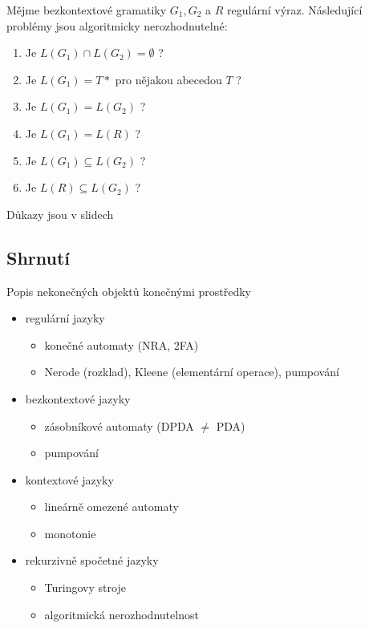 \documentclass[../main.tex]{subfiles}
\begin{document}
\begin{theorem}
    Mějme bezkontextové gramatiky $G_1,G_2$ a $R$ regulární výraz. Následující problémy jsou algoritmicky nerozhodnutelné:
    \begin{enumerate}
        \item Je $L(G_1) \cap L(G_2) = \emptyset$ ?
        \item Je $L(G_1) = T*$ pro nějakou abecedou $T$ ?
        \item Je $L(G_1) = L(G_2) $ ?
        \item Je $L(G_1) = L(R)$ ?
        \item Je $L(G_1) \subseteq L(G_2) $ ?
        \item Je $L(R) \subseteq L(G_2)$ ?
    \end{enumerate} 
    \begin{remark}
        Důkazy jsou v slidech
    \end{remark}
\end{theorem}
\subsection{Shrnutí}
Popis nekonečných objektů konečnými prostředky
\begin{itemize}
    \item regulární jazyky
    \begin{itemize}
        \item konečné automaty (NRA, 2FA)
        \item Nerode (rozklad), Kleene (elementární operace), pumpování
    \end{itemize}
    \item bezkontextové jazyky
    \begin{itemize}
        \item zásobníkové automaty (DPDA $\neq$ PDA)
        \item pumpování
    \end{itemize}
    \item kontextové jazyky
    \begin{itemize}
        \item lineárně omezené automaty
        \item monotonie
    \end{itemize}
    \item rekurzivně spočetné jazyky
    \begin{itemize}
        \item Turingovy stroje
        \item algoritmická nerozhodnutelnost
    \end{itemize}
\end{itemize}
\end{document}
